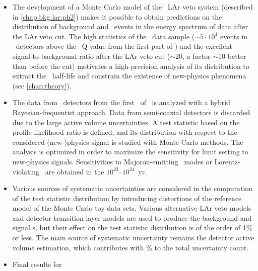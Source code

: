 
\begin{table}
  \centering
  \caption{%
    90\% C.L.~lower limits for Majoron-emitting \onbb\ modes contributing to the \nnbb\
    event distribution. Nuclear matrix elements for spectral index $n=1$ are the same as
    the standard \onbb, and have been therefore selected from the most recent nuclear
    calculations.  Matrix elements for the other decay modes have been taken
    from~\cite{Hirsch1995}.  Phase space factors have been taken from~\cite{Kotila2015}.
    \fillme{numbers}
  }\label{tab:2nbb-ana:onbbx:limits}
  
\end{table}

\chapsummary
\begin{itemize}
  \item The development of a Monte Carlo model of the \gerda\ LAr veto system (described
    in \cref{chap:bkg:lar:ph2}) makes it possible to obtain predictions on the
    distribution of background and \nnbb\ events in the energy spectrum of data after the
    LAr veto cut. The high statistics of the \nnbb\ data sample ($\sim$$5 \cdot 10^4$
    events in \bege\ detectors above the \Arl\ Q-value from the first part of \phasetwo)
    and the excellent signal-to-background ratio after the LAr veto cut ($\sim$20, a
    factor $\sim$10 better than before the cut) motivates a high-precision analysis of its
    distribution to extract the \nnbb\ half-life and constrain the existence of
    new-physics phenomena (see \cref{chap:theory}).
  \item The data from \bege\ detectors from the first \gexpophasetwobkg\ of \phasetwo\
    is analyzed with a hybrid Bayesian-frequentist approach. Data from semi-coaxial
    detectors is discarded due to the large active volume uncertainties. A test statistic
    based on the profile likelihood ratio is defined, and its distribution with respect to
    the considered (new-)physics signal is studied with Monte Carlo methods. The analysis
    is optimized in order to maximize the sensitivity for limit setting to new-physics
    signals. Sensitivities to Majoron-emitting \onbb\ modes or Lorentz-violating \nnbb\
    are obtained in the $10^{23}$--$10^{24}$~yr.
  \item Various sources of systematic uncertainties are considered in the computation of
    the test statistic distribution by introducing distortions of the reference model of
    the Monte Carlo toy data sets. Various alternative LAr veto models and detector
    transition layer models are used to produce the background and signal \pdf{}s, but their
    effect on the test statistic distribution is of the order of 1\% or less. The main
    source of systematic uncertainty remains the detector active volume estimation, which
    contributes with \fillme{?}\% to the total uncertainty count.
  \item Final results for \thalftwo\ \fillme{\ldots}
\end{itemize}

